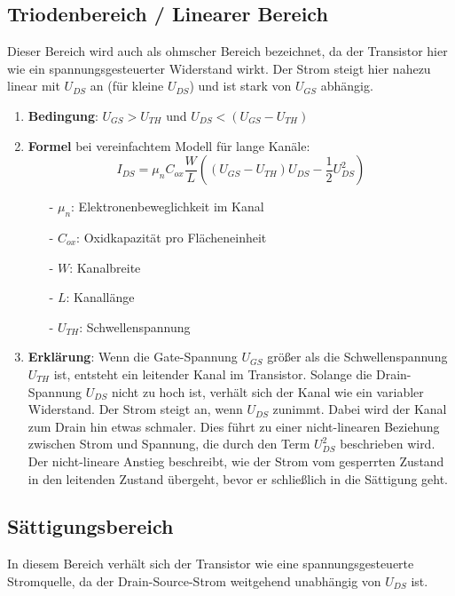 \documentclass{scrarticle}
\numberwithin{equation}{section}
\begin{document}
\subsection{Triodenbereich / Linearer Bereich}
Dieser Bereich wird auch als ohmscher Bereich bezeichnet, da der Transistor hier wie ein spannungsgesteuerter Widerstand wirkt. Der Strom steigt hier nahezu linear mit $U_{DS}$ an (für kleine $U_{DS}$) und ist stark von $U_{GS}$ abhängig.

\begin{enumerate}
	\renewcommand{\labelenumi}{} %
	\item \textbf{Bedingung}: $U_{GS} > U_{TH}$ und $U_{DS} < (U_{GS} - U_{TH})$
	\item \textbf{Formel} bei vereinfachtem Modell für lange Kanäle:
	\begin{equation*}
		I_{DS} = \mu_n C_{ox} \frac{W}{L} \left( (U_{GS} - U_{TH})U_{DS} - \frac{1}{2}U_{DS}^2 \right)
	\end{equation*}
	\begin{itemize}
		\item[-] $\mu_n$: Elektronenbeweglichkeit im Kanal
		\item[-] $C_{ox}$: Oxidkapazität pro Flächeneinheit
		\item[-] $W$: Kanalbreite
		\item[-] $L$: Kanallänge
		\item[-] $U_{TH}$: Schwellenspannung
	\end{itemize}
	\item \textbf{Erklärung}: Wenn die Gate-Spannung $U_{GS}$ größer als die Schwellenspannung $U_{TH}$ ist, entsteht ein leitender Kanal im Transistor. Solange die Drain-Spannung $U_{DS}$ nicht zu hoch ist, verhält sich der Kanal wie ein variabler Widerstand. Der Strom steigt an, wenn $U_{DS}$ zunimmt. Dabei wird der Kanal zum Drain hin etwas schmaler. Dies führt zu einer nicht-linearen Beziehung zwischen Strom und Spannung, die durch den Term $U_{DS}^2$ beschrieben wird. Der nicht-lineare Anstieg beschreibt, wie der Strom vom gesperrten Zustand in den leitenden Zustand übergeht, bevor er schließlich in die Sättigung geht.
\end{enumerate}

\subsection{Sättigungsbereich}
In diesem Bereich verhält sich der Transistor wie eine spannungsgesteuerte Stromquelle, da der Drain-Source-Strom weitgehend unabhängig von $U_{DS}$ ist.
\end{document}
